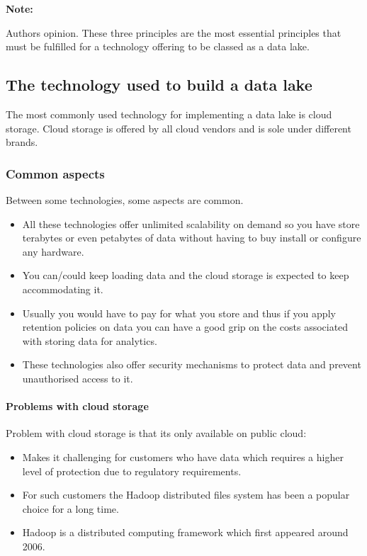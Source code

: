 \documentclass[a4paper, 11pt]{book}
\newenvironment{note}{
    \begin{siderule}
        \textbf{Note: }
        }{
    \end{siderule}}
\begin{document}
    \begin{note}
        Authors opinion. These three principles are the most essential principles that must be fulfilled for a technology offering to be classed as a data lake.
    \end{note}

    \subsection{The technology used to build a data lake}
    The most commonly used technology for implementing a data lake is cloud storage.
    Cloud storage is offered by all cloud vendors and is sole under different brands.

    \subsubsection{Common aspects}
    Between some technologies, some aspects are common.

    \begin{itemize}
        \item All these technologies offer unlimited scalability on demand so you have store terabytes or even petabytes of data without having to buy install or configure any hardware.
        \item You can/could keep loading data and the cloud storage is expected to keep accommodating it.
        \item Usually you would have to pay for what you store and thus if you apply retention policies on data you can have a good grip on the costs associated with storing data for analytics.
        \item These technologies also offer security mechanisms to protect data and prevent unauthorised access to it.
    \end{itemize}

    \paragraph{Problems with cloud storage}
    Problem with cloud storage is that its only available on public cloud:
    \begin{itemize}
        \item Makes it challenging for customers who have data which requires a higher level of protection due to regulatory requirements.
        \item For such customers the Hadoop distributed files system has been a popular choice for a long time.
        \item Hadoop is a distributed computing framework which first appeared around 2006.
    \end{itemize}
\end{document}

